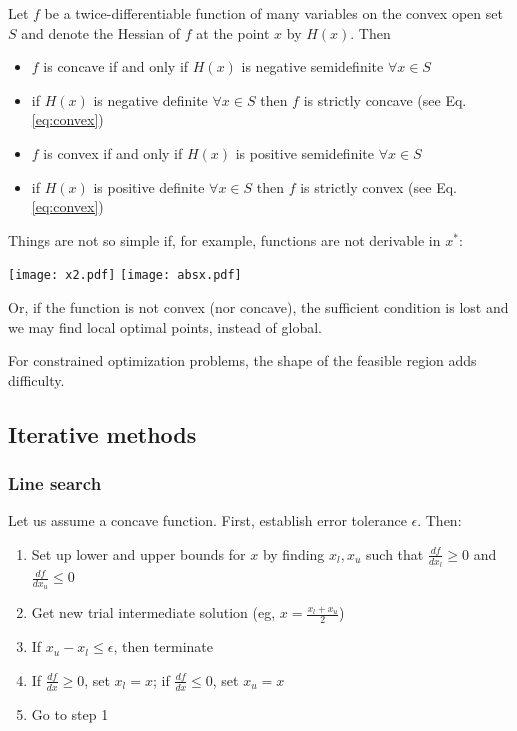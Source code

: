   Let $f$ be a twice-differentiable function of many variables on the convex open set $S$ and denote the Hessian of $f$ at the point $x$ by $H(x)$. Then
\begin{itemize}
  \item $f$ is concave if and only if $H(x)$ is negative semidefinite $\forall x \in S$
  \item if $H(x)$ is negative definite $\forall x \in S$ then $f$ is strictly concave (see Eq. \ref{eq:convex})
  \item $f$ is convex if and only if $H(x)$ is positive semidefinite $\forall x \in S$
  \item if $H(x)$ is positive definite $\forall x \in S$ then $f$ is strictly convex (see Eq. \ref{eq:convex})
\end{itemize}

  Things are not so simple if, for example, functions are not derivable in $x^*$:
  \begin{center}
    \texttt{[image: x2.pdf]}
    \texttt{[image: absx.pdf]}
  \end{center}
  Or, if the function is not convex (nor concave), the sufficient condition is lost and we may find local optimal points, instead of global.

  For constrained optimization problems, the shape of the feasible region adds difficulty.



\subsection{Iterative methods}

\subsubsection{Line search}
Let us assume a concave function. First, establish error tolerance $\epsilon$. Then:
  \begin{enumerate}
    \item Set up lower and upper bounds for $x$ by finding $x_l,x_u$ such that $\frac{df}{dx_l}\geq 0$ and $\frac{df}{dx_u}\leq 0$
    \item Get new trial intermediate solution (eg, $x=\frac{x_l+x_u}{2}$)
    \item If $x_u-x_l\leq \epsilon$, then terminate
    \item If $\frac{df}{dx}\geq 0$, set $x_l=x$; if $\frac{df}{dx}\leq 0$, set $x_u=x$
    \item Go to step 1
  \end{enumerate}

